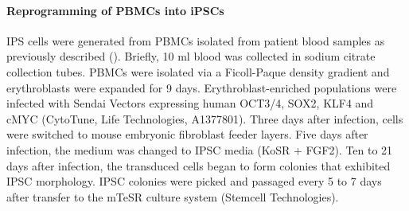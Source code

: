 \paragraph{Reprogramming of PBMCs into iPSCs}
IPS cells were generated from PBMCs isolated from patient blood samples as previously described (\cite{agu_successful_2015}). Briefly, 10 ml blood was collected in sodium citrate collection tubes. PBMCs were isolated via a Ficoll-Paque density gradient and erythroblasts were expanded for 9 days. Erythroblast-enriched populations were infected with Sendai Vectors expressing human OCT3/4, SOX2, KLF4 and cMYC (CytoTune, Life Technologies, A1377801). Three days after infection, cells were switched to mouse embryonic fibroblast feeder layers. Five days after infection, the medium was changed to IPSC media (KoSR + FGF2). Ten to 21 days after infection, the transduced cells began to form colonies that exhibited IPSC morphology. IPSC colonies were picked and passaged every 5 to 7 days after  transfer to the mTeSR culture system (Stemcell Technologies). 


